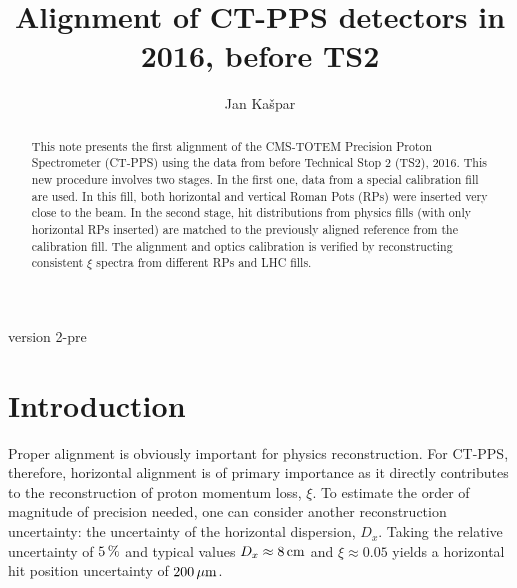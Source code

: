 \documentclass[TOTEM]{cern/cernphprep}
\def\un#1{\,{\rm #1}}
\begin{document}
\begin{titlepage}

\renewcommand{\EXPLOGO}{fig/logo_totem_black.pdf}



\title{Alignment of CT-PPS detectors in 2016, before TS2}


\author{Jan Ka\v spar}


\begin{abstract}
This note presents the first alignment of the CMS-TOTEM Precision Proton Spectrometer (CT-PPS) using the data from before Technical Stop 2 (TS2), 2016. This new procedure involves two stages. In the first one, data from a special calibration fill are used. In this fill, both horizontal and vertical Roman Pots (RPs) were inserted very close to the beam. In the second stage, hit distributions from physics fills (with only horizontal RPs inserted) are matched to the previously aligned reference from the calibration fill. The alignment and optics calibration is verified by reconstructing consistent $\xi$ spectra from different RPs and LHC fills.
\end{abstract}

\centerline{version 2-pre}

\end{titlepage}


\section{Introduction}
\label{s:intro}

Proper alignment is obviously important for physics reconstruction. For CT-PPS, therefore, horizontal alignment is of primary importance as it directly contributes to the reconstruction of proton momentum loss, $\xi$. To estimate the order of magnitude of precision needed, one can consider another reconstruction uncertainty: the uncertainty of the horizontal dispersion, $D_x$. Taking the relative uncertainty of $5\un{\%}$ \cite{optics_calibration} and typical values $D_x \approx 8\un{cm}$ and $\xi \approx 0.05$ yields a horizontal hit position uncertainty of $200\un{\mu m}$.
\end{document}
